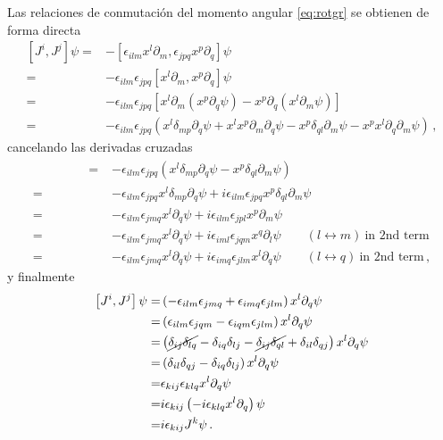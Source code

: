 Las relaciones de conmutación del momento angular \eqref{eq:rotgr} se obtienen de forma directa
\begin{align*}
  \left[ J^i,J^j \right]\psi=&-\left[ \epsilon_{ilm}x^{l}\partial_m ,\epsilon_{jpq}x^{p}\partial_q \right]\psi \nonumber\\
=&-\epsilon_{ilm}\epsilon_{jpq}\left[ x^{l}\partial_m ,x^{p}\partial_q \right]\psi \nonumber\\
=&-\epsilon_{ilm}\epsilon_{jpq}\left[ x^{l}\partial_m \left(x^{p}\partial_q\psi  \right)-x^{p}\partial_q \left( x^{l}\partial_m\psi \right) \right] \nonumber\\
   =&-\epsilon_{ilm}\epsilon_{jpq}\left( x^{l}\delta_{mp}\partial_q\psi +x^{l}x^{p}\partial_m \partial_q\psi  -x^{p}\delta_{ql}\partial_m\psi-x^{p}  x^{l}\partial_q\partial_m\psi \right)\,,
\end{align*}
cancelando las derivadas cruzadas
\begin{align*}
\phantom{\left[ J^i,J^j \right]\psi}   =&-\epsilon_{ilm}\epsilon_{jpq}\left( x^{l}\delta_{mp}\partial_q\psi   -x^{p}\delta_{ql}\partial_m\psi \right) \nonumber\\
   =&-\epsilon_{ilm}\epsilon_{jpq} x^{l}\delta_{mp}\partial_q\psi +i\epsilon_{ilm}\epsilon_{jpq}x^{p}\delta_{ql}\partial_m\psi \nonumber\\
   =&-\epsilon_{ilm}\epsilon_{jmq} x^{l}\partial_q\psi +i\epsilon_{ilm}\epsilon_{jpl}x^{p}\partial_m\psi \nonumber\\
   =&-\epsilon_{ilm}\epsilon_{jmq} x^{l}\partial_q\psi +i\epsilon_{iml}\epsilon_{jqm}x^{q}\partial_l\psi \qquad (l\leftrightarrow m)\ \text{in 2nd term}\nonumber\\
   =&-\epsilon_{ilm}\epsilon_{jmq} x^{l}\partial_q\psi +i\epsilon_{imq}\epsilon_{jlm}x^{l}\partial_q\psi  \qquad (l\leftrightarrow q)\ \text{in 2nd term}\,,
\end{align*}
y finalmente
\begin{align*}
  \left[ J^i,J^j \right]\psi  =& \left(-\epsilon_{ilm}\epsilon_{jmq}+\epsilon_{imq}\epsilon_{jlm}  \right) x^{l}\partial_q\psi \nonumber\\
   =& \left(\epsilon_{ilm}\epsilon_{jqm}-\epsilon_{iqm}\epsilon_{jlm}  \right) x^{l}\partial_q\psi \nonumber\\
   =& \left(\cancel{\delta_{ij}\delta_{lq}}-\delta_{iq}\delta_{lj}-\cancel{\delta_{ij}\delta_{ql}}+\delta_{il}\delta_{qj}  \right) x^{l}\partial_q\psi \nonumber\\
  =& \left(\delta_{il}\delta_{qj}-\delta_{iq}\delta_{lj}  \right) x^{l}\partial_q\psi \nonumber\\
  =& \epsilon_{kij}\epsilon_{klq} x^{l}\partial_q\psi \nonumber\\
  =&i \epsilon_{kij}\left(-i\epsilon_{klq} x^{l}\partial_q  \right)\psi \nonumber\\
  =&i \epsilon_{kij}J^{k}\psi \,.
\end{align*}

